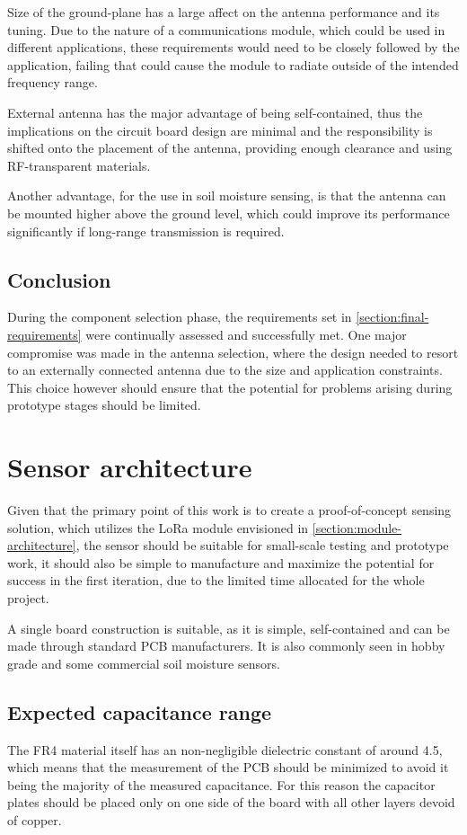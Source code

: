 Size of the ground-plane has a large affect on the antenna performance and its tuning. Due to the nature of a communications module, which could be used in different applications, these requirements would need to be closely followed by the application, failing that could cause the module to radiate outside of the intended frequency range.

External antenna has the major advantage of being self-contained, thus the implications on the circuit board design are minimal and the responsibility is shifted onto the placement of the antenna, providing enough clearance and using RF-transparent materials.

Another advantage, for the use in soil moisture sensing, is that the antenna can be mounted higher above the ground level, which could improve its performance significantly if long-range transmission is required.

\subsection{Conclusion}
During the component selection phase, the requirements set in \ref{section:final-requirements} were continually assessed and successfully met. One major compromise was made in the antenna selection, where the design needed to resort to an externally connected antenna due to the size and application constraints. This choice however should ensure that the potential for problems arising during prototype stages should be limited.

\FloatBarrier
\section{Sensor architecture}
Given that the primary point of this work is to create a proof-of-concept sensing solution, which utilizes the LoRa module envisioned in \ref{section:module-architecture}, the sensor should be suitable for small-scale testing and prototype work, it should also be simple to manufacture and maximize the potential for success in the first iteration, due to the limited time allocated for the whole project.

A single board construction is suitable, as it is simple, self-contained and can be made through standard PCB manufacturers. It is also commonly seen in hobby grade and some commercial soil moisture sensors.

\subsection{\label{section:expected-cap}Expected capacitance range}
The FR4 material itself has an non-negligible dielectric constant of around 4.5, which means that the measurement of the PCB should be minimized to avoid it being the majority of the measured capacitance. For this reason the capacitor plates should be placed only on one side of the board with all other layers devoid of copper.

